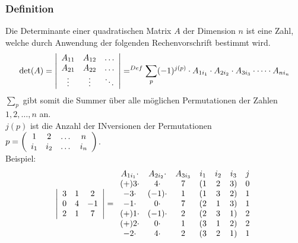 \documentclass{article}
\begin{document}
\subsubsection{Definition}
Die Determinante einer quadratischen Matrix $A$ der Dimension $n$ ist eine Zahl, welche durch Anwendung der folgenden Rechenvorschrift bestimmt wird.
\begin{equation*}
    \det(A) = \left\lvert \begin{array}{c c c}A_{11}&A_{12}&\dots\\A_{21}&A_{22}&\dots\\\vdots&\vdots&\ddots\end{array}\right\rvert =^{Def} \sum_{p}(-1)^{j(p)}\cdot A_{1i_1}\cdot A_{2i_2} \cdot A_{3i_3} \cdot \dots \cdot A_{ni_n}
\end{equation*}
$\sum_{p}$ gibt somit die Summer über alle möglichen Permutationen der Zahlen $1,2,\dots,n$ an.\\
$j(p)$ ist die Anzahl der INversionen der Permutationen $p = \left(\begin{array}{c c c c}1&2&\dots&n\\i_1&i_2&\dots&i_n\end{array}\right)$.\\
Beispiel:
\begin{equation*}
    \left\lvert\begin{array}{c c c}3&1&2\\0&4&-1\\2&1&7\end{array} \right\rvert = \begin{array}{c c c}A_{1i_1} \cdot & A_{2i_2} \cdot & A_{3i_3}\\ (+)3 \cdot & 4 \cdot &7\\-3 \cdot & (-1) \cdot& 1\\-1 \cdot & 0 \cdot & 7\\(+)1 \cdot &(-1) \cdot& 2\\(+)2\cdot&0\cdot&1\\-2 \cdot&4\cdot&2\end{array} \begin{array}{c c c c}i_1 & i_2 & i_3 & j\\(1 & 2& 3) & 0\\(1 & 3&2) & 1\\(2&1&3)&1\\(2&3&1)&2\\(3&1&2)&2\\(3&2&1)&1\end{array}
\end{equation*}
\end{document}
